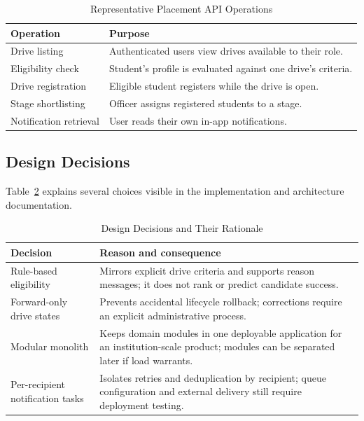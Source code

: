 \documentclass[conference,final]{IEEEtran}
\begin{document}
\begin{table}[!t]
\caption{Representative Placement API Operations}
\label{tab:api}
\centering
\footnotesize
\begin{tabular}{p{} p{}}
\toprule
\textbf{Operation} & \textbf{Purpose} \\
\midrule
Drive listing & Authenticated users view drives available to their role. \\
Eligibility check & Student's profile is evaluated against one drive's criteria. \\
Drive registration & Eligible student registers while the drive is open. \\
Stage shortlisting & Officer assigns registered students to a stage. \\
Notification retrieval & User reads their own in-app notifications. \\
\bottomrule
\end{tabular}
\end{table}

\subsection{Design Decisions}
Table~\ref{tab:decisions} explains several choices visible in the implementation and architecture documentation.

\begin{table}[!t]
\caption{Design Decisions and Their Rationale}
\label{tab:decisions}
\centering
\footnotesize
\begin{tabular}{p{} p{}}
\toprule
\textbf{Decision} & \textbf{Reason and consequence} \\
\midrule
Rule-based eligibility & Mirrors explicit drive criteria and supports reason messages; it does not rank or predict candidate success. \\
Forward-only drive states & Prevents accidental lifecycle rollback; corrections require an explicit administrative process. \\
Modular monolith & Keeps domain modules in one deployable application for an institution-scale product; modules can be separated later if load warrants. \\
Per-recipient notification tasks & Isolates retries and deduplication by recipient; queue configuration and external delivery still require deployment testing. \\
\bottomrule
\end{tabular}
\end{table}
\end{document}
